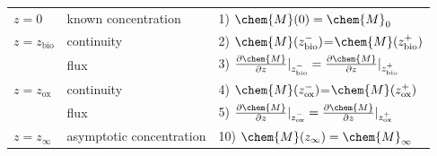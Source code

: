 \documentclass[gmd, manuscript]{copernicus}
\begin{document}
\begin{table}[tbp]
\begin{tabular}{ |l| l| l|}
\hline
$z=0$& known concentration& 1) $\chem{M}(0)=\chem{M}_0$  \\
$z=z_{\mathrm{bio}}$&continuity& 2) $\chem{M}(z_{\mathrm{bio}}^-)$=$\chem{M}(z_{\mathrm{bio}}^+)$\\
  & flux & 3) $\frac{\partial \chem{M}}{\partial z}|_{z_{\mathrm{bio}}^-}=\frac{\partial \chem{M}}{\partial z}|_{z_{\mathrm{bio}}^+}$\\
$z=z_{\mathrm{ox}}$& continuity& 4) $\chem{M}(z_{\mathrm{ox}}^-)$=$\chem{M}(z_{\mathrm{ox}}^+)$\\
  & flux & 5) $\frac{\partial \chem{M}}{\partial z}|_{z_{\mathrm{ox}}^-} =\frac{\partial \chem{M}}{\partial z}|_{z_{\mathrm{ox}}^+}$\\
$z=z_{\infty}$& asymptotic concentration & 10) $\chem{M}(z_\infty)=\chem{M}_\infty$\\
\hline    
\end{tabular}
\label{Tab:BC_PO4+M}
\end{table}
\end{document}
